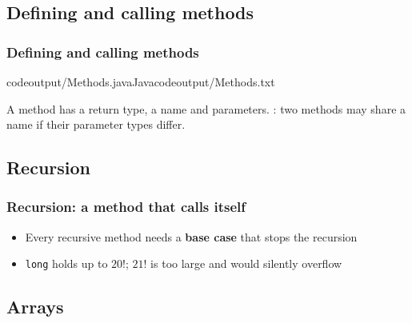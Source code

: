 \documentclass[aspectratio=169,10pt,compress]{beamer}
\begin{document}
\subsection[Methods]{Defining and calling methods}




\begin{frame}[t,fragile] \frametitle{Defining and calling methods}
  \lstcodeoverlaystep[basicstyle=\ttfamily\scriptsize][basicstyle=\ttfamily\scriptsize][0.3\textwidth]{11.3cm,4.4cm}%
    {codeoutput/Methods.java}{Java}{codeoutput/Methods.txt}

  \small A method has a return type, a name and parameters. : two methods may share a name if their parameter types differ.
\end{frame}

\subsection[Recursion]{Recursion}




\begin{frame}[t,fragile] \frametitle{Recursion: a method that calls itself}

  \begin{itemize}\small
    \item Every recursive method needs a \textbf{base case} that stops the recursion
    \item \texttt{long} holds up to $20!$; $21!$ is too large and would silently overflow
  \end{itemize}
\end{frame}


\subsection[Arrays]{Arrays}
\end{document}
